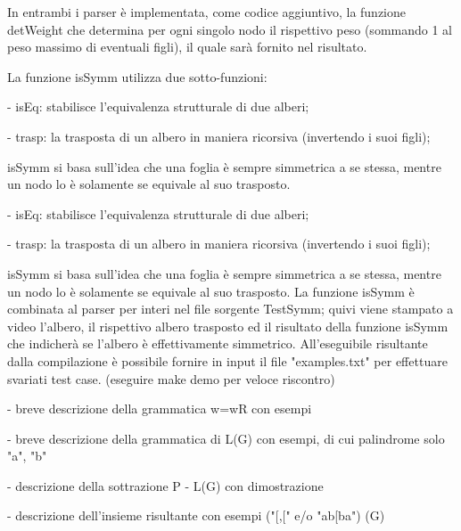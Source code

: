 \documentclass[a4paper, oneside, 11pt]{article}
\begin{document}
\newpage
In entrambi i parser \`e implementata, come codice aggiuntivo, la funzione detWeight che determina per ogni singolo nodo il rispettivo peso (sommando 1 al peso massimo di eventuali figli), il quale sarà fornito nel risultato.

   La funzione isSymm utilizza due sotto-funzioni:

- isEq: stabilisce l'equivalenza strutturale di due alberi;

- trasp: la trasposta di un albero in maniera ricorsiva (invertendo i suoi figli);

isSymm si basa sull'idea che una foglia \`e sempre simmetrica a se stessa, mentre un nodo lo \`e solamente se equivale al suo trasposto.


- isEq: stabilisce l'equivalenza strutturale di due alberi;

- trasp: la trasposta di un albero in maniera ricorsiva (invertendo i suoi figli);

isSymm si basa sull'idea che una foglia \`e sempre simmetrica a se stessa, mentre un nodo lo \`e solamente se equivale al suo trasposto.
   La funzione isSymm \`e combinata al parser per interi nel file sorgente TestSymm; quivi viene stampato a video l'albero, il rispettivo albero trasposto ed il risultato della funzione isSymm che indicherà se l'albero \`e effettivamente simmetrico.
  All'eseguibile risultante dalla compilazione \`e possibile fornire in input il file "examples.txt" per effettuare svariati test case.
  (eseguire make demo per veloce riscontro)

  - breve descrizione della grammatica w=wR con esempi

- breve descrizione della grammatica di L(G) con esempi, di cui palindrome solo "a", "b"

- descrizione della sottrazione P - L(G) con dimostrazione

- descrizione dell'insieme risultante con esempi ("[,[" e/o "ab[ba")
  (G)
\end{document}
